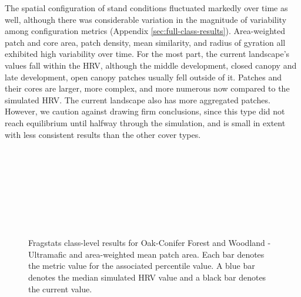 The spatial configuration of stand conditions fluctuated markedly over time as well, although there was considerable variation in the magnitude of variability among configuration metrics (Appendix \ref{sec:full-class-results}). Area-weighted patch and core area, patch density, mean similarity, and radius of gyration all exhibited high variability over time. For the most part, the current landscape's values fall within the HRV, although the middle development, closed canopy and late development, open canopy patches usually fell outside of it. Patches and their cores are larger, more complex, and more numerous now compared to the simulated HRV. The current landscape also has more aggregated patches. However, we caution against drawing firm conclusions, since this type did not reach equilibrium until halfway through the simulation, and is small in extent with less consistent results than the other cover types.

\begin{figure}[!htbp]
  \\%
  \\%
    \\%
    \\%
    \\%
    \\%
    \\%
  \caption{Fragstats class-level results for Oak-Conifer Forest and Woodland - Ultramafic and area-weighted mean patch area. Each bar denotes the metric value for the associated percentile value. A blue bar denotes the median simulated HRV value and a black bar denotes the current value.}
  \label{fig:ocfwu_areaam}
\end{figure}

